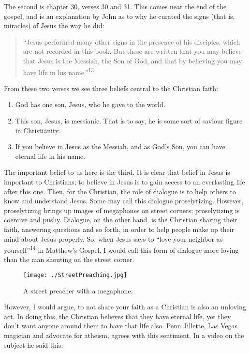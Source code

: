 \documentclass[]{article}
\providecommand{\tightlist}{%
  \setlength{\itemsep}{0pt}\setlength{\parskip}{0pt}}
\begin{document}
The second is chapter 30, verses 30 and 31. This comes near the end of
the gospel, and is an explanation by John as to why he curated the signs
(that is, miracles) of Jesus the way he did:

\begin{quote}
``Jesus performed many other signs in the presence of his disciples,
which are not recorded in this book. But these are written that you may
believe that Jesus is the Messiah, the Son of God, and that by believing
you may have life in his name.''\textsuperscript{13}
\end{quote}

From these two verses we see three beliefs central to the Christian
faith:

\begin{enumerate}
\def\labelenumi{\arabic{enumi}.}
\tightlist
\item
  God has one son, Jesus, who he gave to the world.
\item
  This son, Jesus, is messianic. That is to say, he is some sort of
  saviour figure in Christianity.
\item
  If you believe in Jesus as the Messiah, and as God's Son, you can have
  eternal life in his name.
\end{enumerate}

The important belief to us here is the third. It is clear that belief in
Jesus is important to Christians; to believe in Jesus is to gain access
to an everlasting life after this one. Then, for the Christian, the role
of dialogue is to help others to know and understand Jesus. Some may
call this dialogue proselytizing. However, proselytizing brings up
images of megaphones on street corners; proselytizing is coercive and
pushy. Dialogue, on the other hand, is the Christian sharing their
faith, answering questions and so forth, in order to help people make up
their mind about Jesus properly. So, when Jesus says to ``love your
neighbor as yourself''\textsuperscript{14} in Matthew's Gospel, I would
call this form of dialogue more loving than the man shouting on the
street corner.

\begin{figure}
\centering
\texttt{[image: ./StreetPreaching.jpg]}
\caption{A street preacher with a megaphone.}
\end{figure}

However, I would argue, to not share your faith as a Christian is also
an unloving act. In doing this, the Christian believes that they have
eternal life, yet they don't want anyone around them to have that life
also. Penn Jillette, Las Vegas magician and advocate for atheism, agrees
with this sentiment. In a video on the subject he said this:
\end{document}
